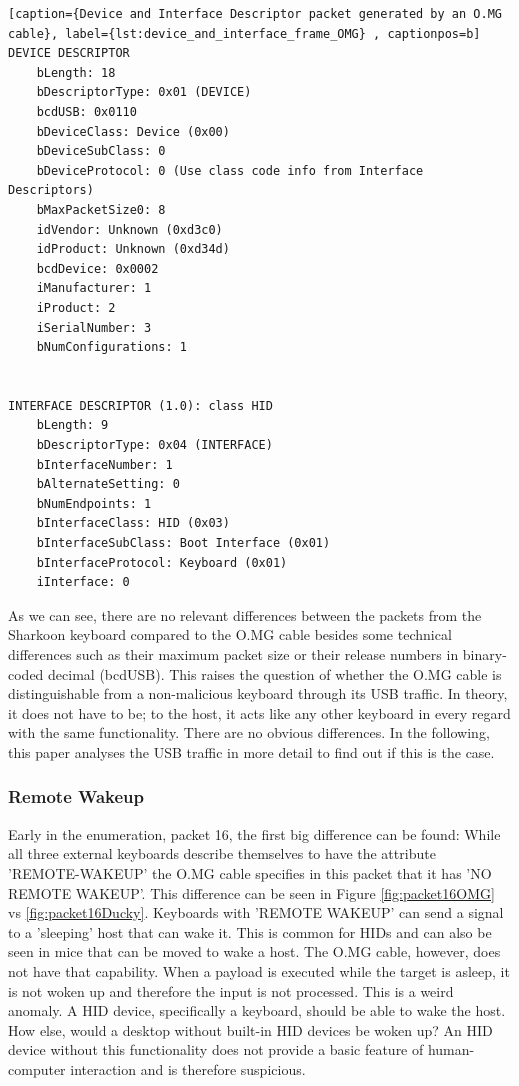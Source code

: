 \begin{lstlisting}[caption={Device and Interface Descriptor packet generated by an O.MG cable}, label={lst:device_and_interface_frame_OMG} , captionpos=b]
DEVICE DESCRIPTOR
    bLength: 18
    bDescriptorType: 0x01 (DEVICE)
    bcdUSB: 0x0110
    bDeviceClass: Device (0x00)
    bDeviceSubClass: 0
    bDeviceProtocol: 0 (Use class code info from Interface Descriptors)
    bMaxPacketSize0: 8
    idVendor: Unknown (0xd3c0)
    idProduct: Unknown (0xd34d)
    bcdDevice: 0x0002
    iManufacturer: 1
    iProduct: 2
    iSerialNumber: 3
    bNumConfigurations: 1


INTERFACE DESCRIPTOR (1.0): class HID
    bLength: 9
    bDescriptorType: 0x04 (INTERFACE)
    bInterfaceNumber: 1
    bAlternateSetting: 0
    bNumEndpoints: 1
    bInterfaceClass: HID (0x03)
    bInterfaceSubClass: Boot Interface (0x01)
    bInterfaceProtocol: Keyboard (0x01)
    iInterface: 0
\end{lstlisting}

As we can see, there are no relevant differences between the packets from the Sharkoon keyboard compared to the O.MG cable besides some technical differences such as their maximum packet size or their release numbers in binary-coded decimal (bcdUSB). This raises the question of whether the O.MG cable is distinguishable
from a non-malicious keyboard through its USB traffic. In theory, it does not have to be; to the host, it acts like any other keyboard in every regard with the same functionality. There are no obvious differences. In the following, this paper analyses the USB traffic in more detail to find out if this is the case.


\subsubsection{Remote Wakeup}

Early in the enumeration, packet 16, the first big difference can be found: While all three external keyboards describe themselves to have the attribute 'REMOTE-WAKEUP' the O.MG cable specifies in this packet that it has 'NO REMOTE WAKEUP'. This difference can be seen in Figure \ref{fig:packet16OMG} vs \ref{fig:packet16Ducky}. Keyboards with 'REMOTE WAKEUP' can send a signal to a 'sleeping' host that can wake it. This is common for HIDs and can also be seen in mice that can be moved to wake a host. The O.MG cable, however, does not have that capability. When a payload is executed while the target is asleep, it is not woken up and therefore the input is not processed. This is a weird anomaly. A HID device, specifically a keyboard, should be able to wake the host. How else, would a desktop without built-in HID devices be woken up? An HID device without this functionality does not provide a basic feature of human-computer interaction and is therefore suspicious.

